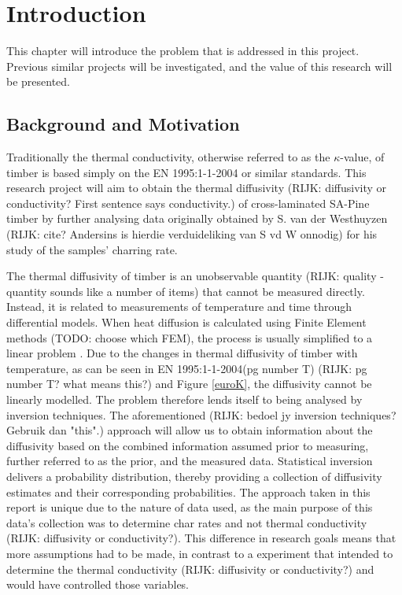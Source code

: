 \chapter{Introduction} \label{introduction}
This chapter will introduce the problem that is addressed in this project. 
Previous similar projects will be investigated, and the value of this research will be presented.

\section{Background and Motivation}

Traditionally the thermal conductivity, otherwise referred to as the $\kappa$-value, of timber is based simply on the EN 1995:1-1-2004 or similar standards.
This research project will aim to obtain the thermal diffusivity (RIJK: diffusivity or conductivity?  First sentence says conductivity.) of cross-laminated SA-Pine timber by further analysing data originally obtained by S. van der Westhuyzen (RIJK: cite? Andersins is hierdie verduideliking van S vd W onnodig) for his study of the samples' charring rate.

The thermal diffusivity of timber is an unobservable quantity (RIJK: quality - quantity sounds like a number of items) that cannot be measured directly. 
Instead, it is related to measurements of temperature and time through differential models. 
When heat diffusion is calculated using Finite Element methods (TODO: choose which FEM), the process is usually simplified to a linear problem \citep{Fish:2007}. 
Due to the changes in thermal diffusivity of timber with temperature, as can be seen in EN 1995:1-1-2004(pg number T) (RIJK: pg number T? what means this?) and Figure \ref{euroK}, the diffusivity cannot be linearly modelled. 
The problem therefore lends itself to being analysed by inversion techniques. 
The aforementioned (RIJK: bedoel jy inversion techniques?  Gebruik dan "this".) approach will allow us to obtain information about the diffusivity based on the combined information assumed prior to measuring, further referred to as the prior, and the measured data. 
Statistical inversion delivers a probability distribution, thereby providing a collection of diffusivity estimates and their corresponding probabilities.
The approach taken in this report is unique due to the nature of data used, as the main purpose of this data's collection was to determine char rates and not thermal conductivity (RIJK: diffusivity or conductivity?).
This difference in research goals means that more assumptions had to be made, in contrast to a experiment that intended to determine the thermal conductivity (RIJK: diffusivity or conductivity?) and would have controlled those variables. 


